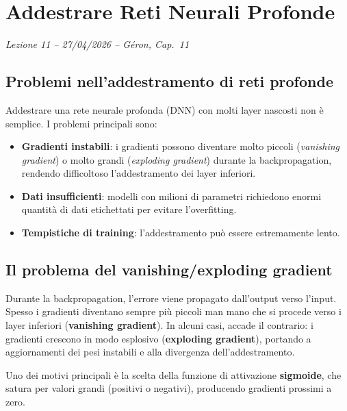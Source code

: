 \chapter{Addestrare Reti Neurali Profonde}
\begin{flushright}\small\textit{Lezione 11 -- 27/04/2026 -- G\'eron, Cap.\ 11}\end{flushright}

\section{Problemi nell'addestramento di reti profonde}

Addestrare una rete neurale profonda (DNN) con molti layer nascosti non è semplice. I problemi principali sono:

\begin{itemize}
    \item \textbf{Gradienti instabili}: i gradienti possono diventare molto piccoli (\emph{vanishing gradient}) o molto grandi (\emph{exploding gradient}) durante la backpropagation, rendendo difficoltoso l'addestramento dei layer inferiori.
    \item \textbf{Dati insufficienti}: modelli con milioni di parametri richiedono enormi quantità di dati etichettati per evitare l'overfitting.
    \item \textbf{Tempistiche di training}: l'addestramento può essere estremamente lento.
\end{itemize}
\section{Il problema del vanishing/exploding gradient}

Durante la backpropagation, l'errore viene propagato dall'output verso l'input. Spesso i gradienti diventano sempre più piccoli man mano che si procede verso i layer inferiori (\textbf{vanishing gradient}). In alcuni casi, accade il contrario: i gradienti crescono in modo esplosivo (\textbf{exploding gradient}), portando a aggiornamenti dei pesi instabili e alla divergenza dell'addestramento.

Uno dei motivi principali è la scelta della funzione di attivazione \textbf{sigmoide}, che satura per valori grandi (positivi o negativi), producendo gradienti prossimi a zero.

\begin{center}
\end{center}

